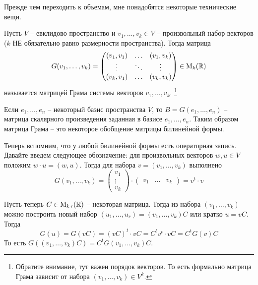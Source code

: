 Прежде чем переходить к объемам, мне понадобятся некоторые технические вещи.

\begin{definition}
Пусть $V$ -- евклидово пространство и $v_1,\ldots,v_k\in V$ -- произвольный набор векторов ($k$ НЕ обязательно равно размерности пространства).
Тогда матрица
\[
G(v_1,\ldots,v_k) =
\begin{pmatrix}
{(v_1,v_1)}&{\ldots}&{(v_1,v_k)}\\
{\vdots}&{\ddots}&{\vdots}\\
{(v_k,v_1)}&{\ldots}&{(v_k,v_k)}\\
\end{pmatrix}
\in\operatorname{M}_{k}(\mathbb R)
\]
называется матрицей Грама системы векторов $v_1,\ldots,v_k$.%
\footnote{Обратите внимание, тут важен порядок векторов.
То есть формально матрица Грама зависит от набора $(v_1,\ldots,v_k)\in V^k$.}
\end{definition}

Если $e_1,\ldots,e_n$ -- некоторый базис пространства $V$, то $B = G(e_1,\ldots,e_n)$ -- матрица скалярного произведения заданная в базисе $e_1,\ldots,e_n$.
Таким образом матрица Грама -- это некоторое обобщение матрицы билинейной формы.

Теперь вспомним, что у любой билинейной формы есть операторная запись.
Давайте введем следующее обозначение: для произвольных векторов $w, u\in V$ положим $w\cdot u = (w, u)$.
Тогда для набора $v = (v_1,\ldots,v_k)$ выполнено
\[
G(v_1,\ldots,v_k) = 
\begin{pmatrix}
{v_1}\\{\vdots}\\{v_k}
\end{pmatrix}
\cdot
\begin{pmatrix}
{v_1}&{\ldots}&{v_k}
\end{pmatrix}
=
v^t \cdot v
\]

Пусть теперь $C\in \operatorname{M}_{k\,r}(\mathbb R)$ -- некоторая матрица.
Тогда из набора $(v_1,\ldots,v_k)$ можно построить новый набор $(u_1,\ldots,u_r) = (v_1,\ldots,v_k)C$ или кратко $u = vC$.
Тогда 
\[
G(u) = G(vC) = (vC)^t \cdot vC = C^t v^t \cdot v C = C^t G(v) C
\]
То есть $G((v_1,\ldots,v_k)C) = C^t G(v_1,\ldots,v_k)C$.


